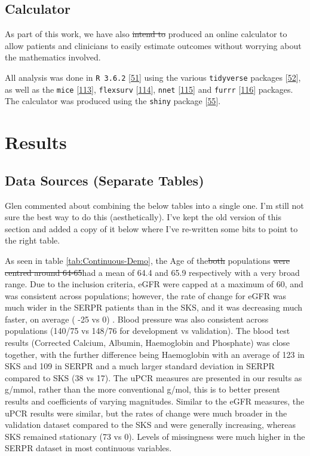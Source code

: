 \documentclass[12pt,PhD,twoside,openright]{muthesis}
\begin{document}
\hypertarget{calculator}{%
\subsection{Calculator}\label{calculator}}

As part of this work, we have also \sout{intend to} produced an online calculator to allow patients and clinicians to easily estimate outcomes without worrying about the mathematics involved.

All analysis was done in \texttt{R\ 3.6.2} {[}\protect\hyperlink{ref-r_core_team_r_nodate}{51}{]} using the various \texttt{tidyverse} packages {[}\protect\hyperlink{ref-wickham_tidy_2017}{52}{]}, as well as the \texttt{mice} {[}\protect\hyperlink{ref-buuren_mice_2011-1}{113}{]}, \texttt{flexsurv} {[}\protect\hyperlink{ref-jackson_flexsurv_nodate}{114}{]}, \texttt{nnet} {[}\protect\hyperlink{ref-ripley_package_2016}{115}{]} and \texttt{furrr} {[}\protect\hyperlink{ref-vaughan_furrr_2018}{116}{]} packages. The calculator was produced using the \texttt{shiny} package {[}\protect\hyperlink{ref-chang_shiny_2020}{55}{]}.

\hypertarget{results-5}{%
\section{Results}\label{results-5}}

\hypertarget{data-sources-separate-tables}{%
\subsection{Data Sources (Separate Tables)}\label{data-sources-separate-tables}}

Glen commented about combining the below tables into a single one. I'm still not sure the best way to do this (aesthetically). I've kept the old version of this section and added a copy of it below where I've re-written some bits to point to the right table.

As seen in table \ref{tab:Continuous-Demo}, the Age of the\sout{both} populations \sout{were centred around 64-65}had a mean of 64.4 and 65.9 respectively with a very broad range. Due to the inclusion criteria, eGFR were capped at a maximum of 60, and was consistent across populations; however, the rate of change for eGFR was much wider in the SERPR patients than in the SKS, and it was decreasing much faster, on average ( -25 vs 0) . Blood pressure was also consistent across populations (140/75 vs 148/76 for development vs validation). The blood test results (Corrected Calcium, Albumin, Haemoglobin and Phosphate) was close together, with the further difference being Haemoglobin with an average of 123 in SKS and 109 in SERPR and a much larger standard deviation in SERPR compared to SKS (38 vs 17). The uPCR measures are presented in our results as g/mmol, rather than the more conventional g/mol, this is to better present results and coefficients of varying magnitudes. Similar to the eGFR measures, the uPCR results were similar, but the rates of change were much broader in the validation dataset compared to the SKS and were generally increasing, whereas SKS remained stationary (73 vs 0). Levels of missingness were much higher in the SERPR dataset in most continuous variables.
\end{document}
